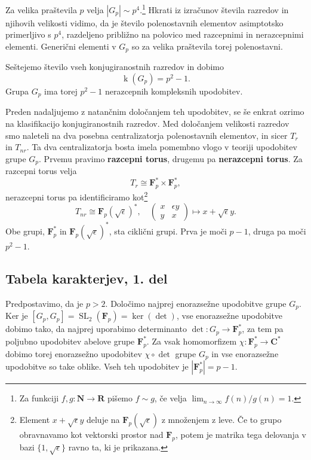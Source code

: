 \documentclass[11pt]{book}
\def\NN{\mathbf{N}}
\def\RR{\mathbf{R}}
\def\CC{\mathbf{C}}
\def\FF{\mathbf{F}}
\DeclareMathOperator\kk{k}
\DeclareMathOperator\SL{SL}
\def\definicija{\color{rdeca}\bf}
\theoremstyle{definition}
\theoremstyle{zgled}
\theoremstyle{zgledbrezstevilke}
\theoremstyle{odprtproblem}
\theoremstyle{domacanaloga}
\theoremstyle{izrek}
\begin{document}
Za velika praštevila $p$ velja $|G_p| \sim p^4$.\footnote{Za funkciji $f,g \colon \NN \to \RR$ pišemo $f \sim g$, če velja $\lim_{n \to \infty} f(n)/g(n) = 1$.} Hkrati iz izračunov števila razredov in njihovih velikosti vidimo, da je število polenostavnih elementov asimptotsko primerljivo s $p^4$, razdeljeno približno na polovico med razcepnimi in nerazcepnimi elementi. Generični elementi v $G_p$ so za velika praštevila torej polenostavni. 

Seštejemo število vseh konjugiranostnih razredov in dobimo
\[
    \kk(G_p) = p^2 - 1.
\]
Grupa $G_p$ ima torej $p^2-1$ nerazcepnih kompleksnih upodobitev. 

Preden nadaljujemo z natančnim določanjem teh upodobitev, se še enkrat ozrimo na klasifikacijo konjugiranostnih razredov. Med določanjem velikosti razredov smo naleteli na dva posebna centralizatorja polenostavnih elementov, in sicer $T_r$ in $T_{nr}$. Ta dva centralizatorja bosta imela pomembno vlogo v teoriji upodobitev grupe $G_p$. Prvemu pravimo {\definicija razcepni torus}, drugemu pa {\definicija nerazcepni torus}. Za razcepni torus velja
\[
    T_r \cong \FF_p^* \times \FF_p^*,
\]
nerazcepni torus pa identificiramo kot\footnote{Element $x + \sqrt{\epsilon} y$ deluje na $\FF_p(\sqrt{\epsilon})$ z množenjem z leve. Če to grupo obravnavamo kot vektorski prostor nad $\FF_p$, potem je matrika tega delovanja v bazi $\{ 1, \sqrt{\epsilon} \}$ ravno ta, ki je prikazana.}
\[
    T_{nr} \cong \FF_p(\sqrt{\epsilon})^*, \quad
    \begin{pmatrix}
        x & \epsilon y \\ y & x
    \end{pmatrix}
    \mapsto x + \sqrt{\epsilon} y.
\]
Obe grupi, $\FF_p^*$ in $\FF_p(\sqrt{\epsilon})^*$, sta ciklični grupi. Prva je moči $p-1$, druga pa moči $p^2 - 1$. 

\subsection{Tabela karakterjev, 1. del}

Predpostavimo, da je $p > 2$. Določimo najprej enorazsežne upodobitve grupe $G_p$. Ker je $[G_p, G_p] = \SL_2(\FF_p) = \ker (\det)$, vse enorazsežne upodobitve dobimo tako, da najprej uporabimo determinanto $\det \colon G_p \to \FF_p^*$, za tem pa poljubno upodobitev abelove grupe $\FF_p^*$. Za vsak homomorfizem $\chi \colon \FF_p^* \to \CC^*$ dobimo torej enorazsežno upodobitev $\chi \circ \det$ grupe $G_p$ in vse enorazsežne upodobitve so take oblike. Vseh teh upodobitev je $|\FF_p^*| = p-1$.
\end{document}
